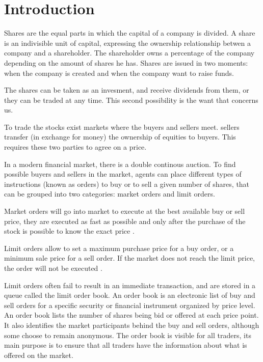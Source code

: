 \section{Introduction}\label{sec:introduction}

Shares are the equal parts in which the capital of a company is divided.
A share is an indivisible unit of capital, expressing the ownership
relationship betwen a company and a shareholder. The shareholder owns a
percentage of the company depending on the amount of shares he has.
Shares are issued in two moments: when the company is created and when the
company want to raise funds.

The shares can be taken as an invesment, and receive dividends from them, or
they can be traded at any time.  This second possibility is the want that
concerns us.

To trade the stocks exist markets where the buyers and sellers meet. sellers
transfer (in exchange for money) the ownership of equities to buyers. This
requires these two parties to agree on a price.

In a modern financial market, there is a double continous auction. To find
possible buyers and sellers in the market, agents can place different types of
instructions (known as orders) to buy or to sell a given number of shares, that
can be grouped into two categories: market orders and limit orders.

Market orders will go into market to execute at the best available buy or sell
price, they are executed as fast as possible and only after the purchase of the
stock is possible to know the exact price \cite{large_prices_changes}.

Limit orders allow to set a maximum purchase price for a buy order, or a
minimum sale price for a sell order. If the market does not reach the limit
price, the order will not be executed \cite{large_prices_changes}.

Limit orders often fail to result in an immediate transaction, and are stored
in a queue called the limit order book. An order book is an electronic list of
buy and sell orders for a specific security or financial instrument organized
by price level. An order book lists the number of shares being bid or offered
at each price point. It also identifies the market participants behind the buy
and sell orders, although some choose to remain anonymous. The order book is
visible for all traders, its main purpose is to ensure that all traders have
the information about what is offered on the market.

